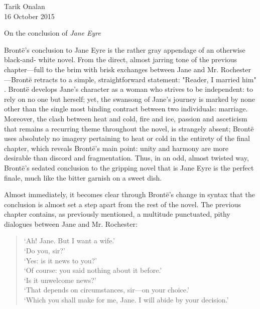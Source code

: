 \documentclass[a4paper,12pt]{article}
\begin{document}
    \begin{flushleft}
        Tarik Onalan\\
        16 October 2015\\
        \begin{center}
            On the conclusion of \textit{Jane Eyre}
        \end{center}

        Brontë's conclusion to Jane Eyre is the rather gray appendage of an otherwise black-and-
        white novel. From the direct, almost jarring tone of the previous chapter---full to the brim
        with brisk exchanges between Jane and Mr. Rochester---Brontë retracts to a simple,
        straightforward statement: "Reader, I married him" \cite[521]{brontec}. Brontë develops Jane's
        character as a woman who strives to be independent: to rely on no one but herself; yet, the
        swansong of Jane's journey is marked by none other than the single most binding contract
        between two individuals: marriage. Moreover, the clash between heat and cold, fire and ice,
        passion and asceticism that remains a recurring theme throughout the novel, is strangely
        absent; Brontë uses absolutely no imagery pertaining to heat or cold in the entirety of the
        final chapter, which reveals Brontë's main point: unity and harmony are more desirable than
        discord and fragmentation. Thus, in an odd, almost twisted way, Brontë's sedated conclusion
        to the gripping novel that is Jane Eyre is the perfect finale, much like the bitter garnish
        on a sweet dish.

        Almost immediately, it becomes clear through Brontë's change in syntax that the conclusion
        is almost set a step apart from the rest of the novel. The previous chapter contains, as
        previously mentioned, a multitude punctuated, pithy dialogues between Jane and Mr.
        Rochester:
        \begin{quote}
            `Ah! Jane. But I want a wife.'\\
            `Do you, sir?'\\
            `Yes: is it news to you?'\\
            `Of course: you said nothing about it before.'\\
            `Is it unwelcome news?'\\
            `That depends on circumstances, sir—on your choice.'\\
            `Which you shall make for me, Jane. I will abide by your decision.'\\


\end{quote}
\end{flushleft}
\end{document}
